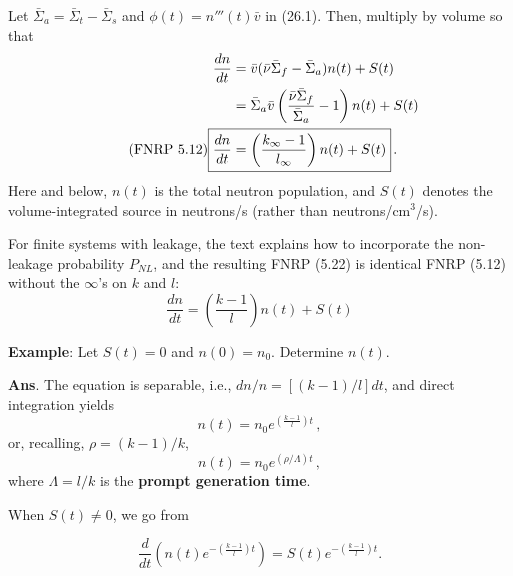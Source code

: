 \documentclass[compact]{ne630handout}
\begin{document}
\begin{handoutflow}
Let $\bar{\Sigma}_a = \bar{\Sigma}_t - \bar{\Sigma}_s$ and $\phi(t) = n'''(t)\bar{v}$ in (26.1). Then, multiply by volume so that
\begin{align*}
  \frac{dn}{dt}
 &= \bar{v} (\bar{\nu}\bar{\Sigma}_f - \bar{\Sigma}_a) n(t)
  + S(t) \\
 &= \bar{\Sigma}_a\bar{v} \left ( \frac{\bar{\nu}\bar{\Sigma}_f}{\bar{\Sigma}_a} - 1 \right ) n(t)
  + S(t) \\
 \tag{FNRP 5.12}
 \Aboxed{\frac{dn}{dt} &= \left ( \frac{k_{\infty} - 1}{l_{\infty}} \right ) n(t)
  + S(t)} \, .
\end{align*}
Here and below, $n(t)$ is the total neutron population, and $S(t)$ denotes
the volume-integrated source in neutrons/s (rather than neutrons/cm$^3$/s).



For finite systems with leakage, the text explains how to incorporate the non-leakage probability $P_{NL}$, and the resulting FNRP (5.22) is identical FNRP (5.12) without the $\infty$'s on $k$ and $l$:
\begin{equation*}
\tag{FNRP 5.22}
\frac{dn}{dt}  = \left ( \frac{k - 1}{l} \right ) n(t) + S(t)
\end{equation*}




{\bf Example}: Let $S(t) = 0$ and $n(0) = n_0$.  Determine $n(t)$.


\textcolor{wcprimary}{
{\small {\bf Ans}.  The equation is separable, i.e., $dn/n = [(k-1)/l]dt$, and direct integration yields
\begin{equation*}
  \tag{FNRP 5.24}
  \boxed{ n(t)  =  n_0 e^{\left ( \displaystyle \frac{k - 1}{l}  \right ) t} } \, ,
\end{equation*}
or, recalling, $\rho = (k-1)/k$,
\begin{equation*}
  \tag{FNRP 5.24}
  \boxed{ n(t)  =  n_0 e^{ (\rho/\Lambda) t} } \, ,
\end{equation*}
where $\Lambda = l/k$ is the {\bf prompt generation time}.
}}



When $S(t) \neq 0$, we go from

\begin{equation*}
   \frac{d}{dt} \left ( n(t) e^{-\left(\frac{k-1}{l}\right )t} \right ) = S(t) e^{-\left(\frac{k-1}{l}\right )t} .
\end{equation*}


\end{handoutflow}
\end{document}
